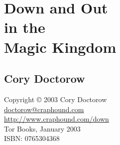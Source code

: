 


\section{Down and Out\\in the\\Magic Kingdom}

\subsection{Cory Doctorow}
\begin{flushleft}
Copyright © 2003 Cory Doctorow\\
\href{mailto:doctorow@craphound.com}{doctorow@craphound.com}\\
\href{http://www.craphound.com/down}{http://www.craphound.com/down}\\
Tor Books, January 2003\\
ISBN: 0765304368\
\end{flushleft}

